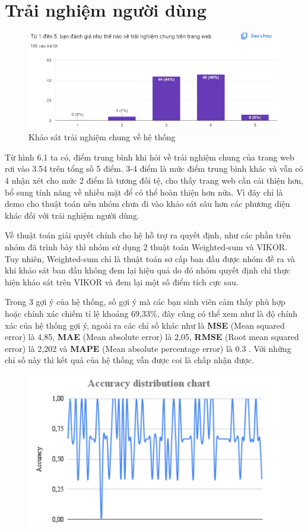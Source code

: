 \section{Trải nghiệm người dùng}

\begin{figure}[H]
    \centering
    \includegraphics[width=0.8\linewidth]{images/survey1.png}
    \vspace{0.6cm}
    \caption{Khảo sát trải nghiệm chung về hệ thống}
\end{figure}

Từ hình 6.1 ta có, điểm trung bình khi hỏi về trải nghiệm chung của trang web rơi vào 3.54 trên tổng số 5 điểm. 3-4 điểm là mức điểm trung bình khác và vẫn có 4 nhận xét cho mức 2 điểm là tương đối tệ, cho thấy trang web cần cải thiện hơn, bổ sung tính năng về nhiều mặt để có thể hoàn thiện hơn nữa. Vì đây chỉ là demo cho thuật toán nên nhóm chưa đi vào khảo sát sâu hơn các phương diện khác đối với trải nghiệm người dùng. 

Về thuật toán giải quyết chính cho hệ hỗ trợ ra quyết định, như các phần trên nhóm đã trình bày thì nhóm sử dụng 2 thuật toán Weighted-sum và VIKOR. Tuy nhiên, Weighted-sum chỉ là thuật toán sơ cấp ban đầu được nhóm đề ra và khi khảo sát ban đầu không đem lại hiệu quả do đó nhóm quyết định chỉ thực hiện khảo sát trên VIKOR và đem lại một số điểm tích cực sau. 

Trong 3 gợi ý của hệ thống, số gợi ý mà các bạn sinh viên cảm thấy phù hợp hoặc chính xác chiếm tỉ lệ khoảng 69,33\%, đây cũng có thể xem như là độ chính xác của hệ thống gợi ý, ngoài ra các chỉ số khác như là \textbf{MSE} (Mean squared error) là 4,85, \textbf{MAE} (Mean absolute error) là 2,05, \textbf{RMSE} (Root mean squared error) là 2,202 và \textbf{MAPE} (Mean absolute percentage error) là 0.3 \cite{thu}. Với những chỉ số này thì kết quả của hệ thống vẫn được coi là chấp nhận được.
\begin{figure}[H]
    \centering
    \includegraphics[width=0.6\linewidth]{images/accChart.png}
\end{figure}

